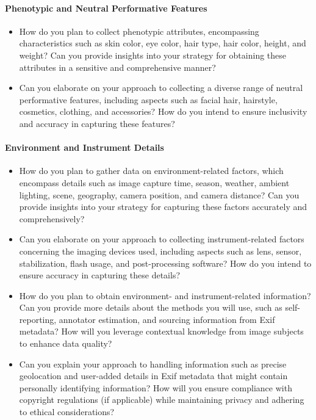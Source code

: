 \paragraph{Phenotypic and Neutral Performative Features}
\begin{itemize}
  \item How do you plan to collect phenotypic attributes, encompassing characteristics
  such as skin color, eye color, hair type, hair color, height, and weight? Can you
  provide insights into your strategy for obtaining these attributes in a sensitive
  and comprehensive manner?
  \item Can you elaborate on your approach to collecting a diverse range of neutral
  performative features, including aspects such as facial hair, hairstyle, cosmetics,
  clothing, and accessories? How do you intend to ensure inclusivity and accuracy in
  capturing these features?
\end{itemize}

\paragraph{Environment and Instrument Details}
\begin{itemize}
  \item How do you plan to gather data on environment-related factors, which encompass
  details such as image capture time, season, weather, ambient lighting, scene,
  geography, camera position, and camera distance? Can you provide insights into your
  strategy for capturing these factors accurately and comprehensively?
  \item Can you elaborate on your approach to collecting instrument-related factors
  concerning the imaging devices used, including aspects such as lens, sensor,
  stabilization, flash usage, and post-processing software? How do you intend to
  ensure accuracy in capturing these details?
  \item How do you plan to obtain environment- and instrument-related information?
  Can you provide more details about the methods you will use, such as self-reporting,
  annotator estimation, and sourcing information from Exif metadata? How will you
  leverage contextual knowledge from image subjects to enhance data quality?
  \item Can you explain your approach to handling information such as precise
  geolocation and user-added details in Exif metadata that might contain personally
  identifying information? How will you ensure compliance with copyright regulations
  (if applicable) while maintaining privacy and adhering to ethical considerations?
\end{itemize}

